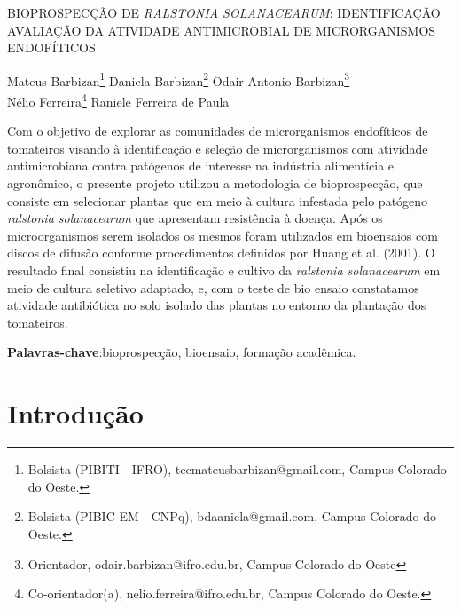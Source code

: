\documentclass[article,12pt,onesidea,4paper,english,brazil]{abntex2}
\begin{document}
	
	
	\frenchspacing 
	
	\begin{center}
		\LARGE BIOPROSPECÇÃO DE \textit{RALSTONIA SOLANACEARUM}: IDENTIFICAÇÃO AVALIAÇÃO DA ATIVIDADE ANTIMICROBIAL DE MICRORGANISMOS ENDOFÍTICOS
		
		\normalsize
Mateus Barbizan\footnote{Bolsista (PIBITI - IFRO), tccmateusbarbizan@gmail.com, Campus Colorado do Oeste. } 
Daniela Barbizan\footnote{Bolsista (PIBIC EM - CNPq), bdaaniela@gmail.com, Campus Colorado do Oeste.} 
		Odair Antonio Barbizan\footnote{Orientador, odair.barbizan@ifro.edu.br, Campus Colorado do Oeste} \\
		Nélio Ferreira\footnote{Co-orientador(a), nelio.ferreira@ifro.edu.br, Campus Colorado do Oeste.} 
		Raniele Ferreira de Paula
	\end{center}
	
	\begin{resumoumacoluna}
		Com o objetivo de explorar as comunidades de microrganismos endofíticos de tomateiros visando à identificação e seleção de microrganismos com atividade antimicrobiana contra patógenos de interesse na indústria alimentícia e agronômico, o presente projeto utilizou a metodologia de bioprospecção, que consiste em selecionar plantas que em meio à cultura infestada pelo patógeno \textit{ralstonia solanacearum} que apresentam resistência à doença. Após os microorganismos serem isolados os mesmos foram utilizados em bioensaios com discos de difusão conforme procedimentos definidos por Huang et al. (2001). O resultado final consistiu na identificação e cultivo da \textit{ralstonia solanacearum} em meio de cultura seletivo adaptado, e, com o teste de bio ensaio constatamos atividade antibiótica no solo isolado das plantas no entorno da plantação dos tomateiros.
		\vspace{\onelineskip}
		
		\noindent
		\textbf{Palavras-chave}:bioprospecção, bioensaio, formação acadêmica.
	\end{resumoumacoluna}
	
	\textual
	
	\section*{Introdução}
	
\end{document}
